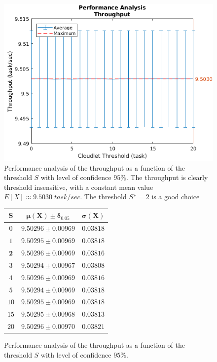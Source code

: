 \begin{figure}
	\includegraphics[width=\columnwidth]{fig/evaluation-performance-analysis-throughput}
	\caption{Performance analysis of the throughput as a function of the threshold $S$  with level of confidence $95\%$. The throughput is clearly threshold insensitive, with a constant mean value $E[X]\approx9.5030 \; task/sec$. The threshold $S*=2$ is a good choice}
	\label{fig:evaluation-performance-analysis-throughput}
\end{figure}

\begin{figure}
	\begin{center}
		\begin{tabular}{|c||c|c|}
			\hline
			$\mathbf{S}$ & $\mathbf{\mu(X)\pm\delta_{0.05}}$ & $\mathbf{\sigma(X)}$\\
			\hline
			$0$  & $9.50296\pm 0.00969$ & $0.03818 $ \\
			$1$  & $9.50295\pm 0.00969$ & $0.03818$ \\
			$\mathbf{2}$  & $\mathbf{9.50296\pm 0.00969}$ & $\mathbf{0.03816}$ \\
			$3$  & $9.50294\pm 0.00967$ & $0.03808$ \\
			$4$  & $9.50296\pm 0.00969$ & $0.03816$ \\
			$5$  & $9.50294\pm 0.00969$ & $0.03818$ \\
			$10$ & $9.50295\pm 0.00969$ & $0.03818$ \\
			$15$ & $9.50295\pm 0.00968$ & $0.03813$ \\
			$20$ & $9.50296\pm 0.00970$ & $0.03821$ \\
			\hline
		\end{tabular}
	\end{center}
	\caption{Performance analysis of the throughput as a function of the threshold $S$ with level of confidence $95\%$.}
	\label{tbl:evaluation-performance-analysis-throughput}
\end{figure}

